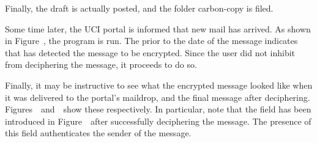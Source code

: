 Finally, the draft is actually posted, and the folder carbon-copy is filed.

Some time later, the UCI portal is informed that new mail has arrived.
As shown in Figure~\recvmail,
the  program is run.
The  prior to the date of the message indicates that  has
detected the message to be encrypted.
Since the user did not inhibit  from deciphering the message,
it proceeds to do so.

Finally, it may be instructive to see what the encrypted message looked like
when it was delivered to the portal's maildrop,
and the final message after deciphering.
Figures~\before\ and~\after\ show these respectively.
In particular,
note that the  field has been introduced in Figure~\after\
after successfully deciphering the message.
The presence of this field authenticates the sender of the message.
